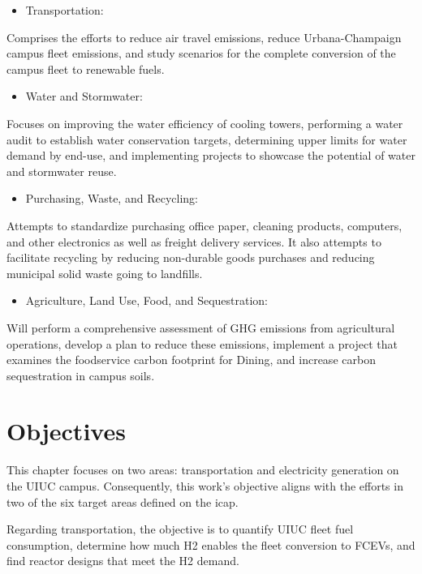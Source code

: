 \begin{itemize}
	\item Transportation:
\end{itemize}
Comprises the efforts to reduce air travel emissions, reduce Urbana-Champaign campus fleet emissions, and study scenarios for the complete conversion of the campus fleet to renewable fuels.

\begin{itemize}
	\item Water and Stormwater:
\end{itemize}
Focuses on improving the water efficiency of cooling towers, performing a water audit to establish water conservation targets, determining upper limits for water demand by end-use, and implementing projects to showcase the potential of water and stormwater reuse.

\begin{itemize}
	\item Purchasing, Waste, and Recycling:
\end{itemize}
Attempts to standardize purchasing office paper, cleaning products, computers, and other electronics as well as freight delivery services.
It also attempts to facilitate recycling by reducing non-durable goods purchases and reducing municipal solid waste going to landfills.

\begin{itemize}
	\item Agriculture, Land Use, Food, and Sequestration:
\end{itemize}
Will perform a comprehensive assessment of \gls{GHG} emissions from agricultural operations, develop a plan to reduce these emissions, implement a project that examines the foodservice carbon footprint for Dining, and increase carbon sequestration in campus soils.


\section{Objectives}
\label{sec:hydro-objectives}

This chapter focuses on two areas: transportation and electricity generation on the \gls{UIUC} campus.
Consequently, this work's objective aligns with the efforts in two of the six target areas defined on the \gls{icap}.

Regarding transportation, the objective is to quantify UIUC fleet fuel consumption, determine how much \gls{H2} enables the fleet conversion to \glspl{FCEV}, and find reactor designs that meet the \gls{H2} demand.

